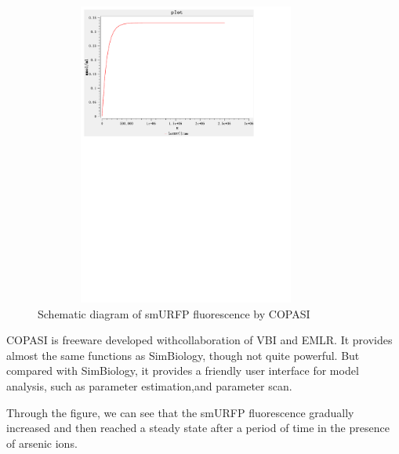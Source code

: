 \begin{figure}[h]
	\centering
	\includegraphics[width=10cm,height=10cm]{smuRFP}
	\caption{Schematic diagram of smURFP fluorescence by COPASI}
\end{figure}



COPASI is freeware developed withcollaboration of VBI and EMLR. It provides
almost the same functions as SimBiology, though not quite powerful. But compared with SimBiology, it provides a friendly user interface for model analysis, such as parameter estimation,and parameter scan.

Through the figure, we can see that the smURFP fluorescence gradually increased and then reached a steady state after a period of time  in the presence of arsenic ions.

